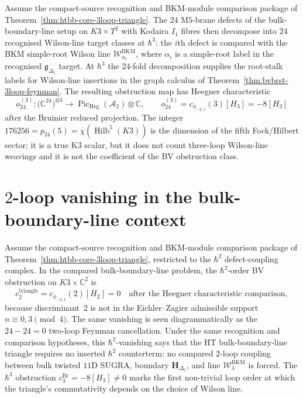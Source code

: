\begin{remark}
\label{rem:htbb-core-24fold-3loop}
Assume the compact-source recognition and BKM-module comparison package
of Theorem~\ref{thm:htbb-core-3loop-triangle}.  The $24$ M$5$-brane
defects of the bulk-boundary-line setup on $K3\times T^2$ with Kodaira
$I_1$ fibres then decompose into $24$ recognised Wilson-line target
classes at $\hbar^3$: the $i$th defect is compared with the BKM
simple-root Wilson line
$\mathcal{W}^{\mathrm{BKM}}_{\alpha_i}$, where \(\alpha_i\) is a
simple-root label in the recognised \(\mathfrak g_{\Delta_5}\) target.
At $\hbar^3$ the $24$-fold decomposition supplies the root-stalk labels
for Wilson-line insertions in the graph calculus of
Theorem~\ref{thm:bvbrst-3loop-feynman}. The resulting obstruction map
has Heegner characteristic
\[
 o^{(3)}_{24}\colon
 \bigl(\mathbb C^{24}\bigr)^{\otimes 3}
 \longrightarrow
 \operatorname{Pic}_{\mathrm{Heg}}(\mathcal A_2)\otimes\mathbb C,
 \qquad
 o^{(3)}_{24}=c_{\phi_{-2,1}}(3)[H_3]=-8[H_3]
\]
after the Bruinier reduced projection. The integer
$176256=p_{24}(5)=\chi(\operatorname{Hilb}^5(K3))$ is the dimension of
the fifth Fock/Hilbert sector; it is a true K3 scalar, but it does not
count three-loop Wilson-line weavings and it is not the coefficient of
the BV obstruction class.
\end{remark}

\section{$2$-loop vanishing in the
bulk-boundary-line context}
\label{sec:htbb-core-2loop-vanish}

\begin{remark}
\label{rem:htbb-core-2loop-vanish}

Assume the compact-source recognition and BKM-module comparison package
of Theorem~\ref{thm:htbb-core-3loop-triangle}, restricted to the
$\hbar^2$ defect-coupling complex. In the compared
bulk-boundary-line problem, the $\hbar^2$-order BV obstruction on
$K3\times\mathbb{C}^2$ is
\[
 c^{\mathrm{triangle}}_2
 = c_{\phi_{-2,1}}(2)[H_2]
 =0
 \quad\text{after the Heegner characteristic comparison},
\]
because discriminant~$2$ is not in the Eichler--Zagier admissible
support $n\equiv 0,3\pmod 4$. The same vanishing is seen diagrammatically as
the $24-24=0$ two-loop Feynman cancellation. Under the same recognition
and comparison hypotheses, this $\hbar^2$-vanishing says that the HT
bulk-boundary-line triangle requires no inserted $\hbar^2$ counterterm:
no compared $2$-loop coupling between bulk twisted $11$D SUGRA,
boundary $\mathbf{H}_{\Delta_5}$, and line
$\mathcal{W}^{\mathrm{BKM}}_\lambda$ is forced. The
$\hbar^3$ obstruction $c^{\mathrm{Br}}_3=-8[H_3]\neq 0$ marks the first non-trivial
loop order at which the triangle's commutativity depends on the
choice of Wilson line.
\end{remark}

